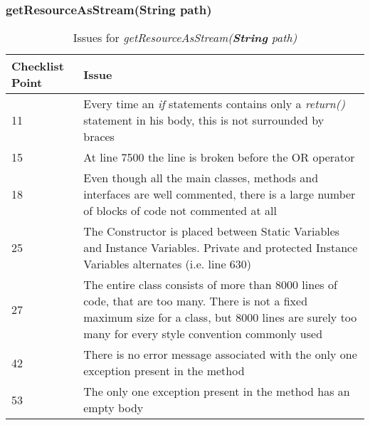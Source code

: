 \subsubsection{getResourceAsStream(String path)}
\begin{table}[htbp]
\begin{center}
\begin{tabular}[t]{p{}p{}}

\hline
\textbf{Checklist Point} & \textbf{Issue} \\
\hline
11 & Every time an \textit{if} statements contains only a \textit{return()} statement in his body, this is not surrounded by braces \\
\hline
15 & At line 7500 the line is broken before the OR operator \\
\hline
18 & Even though all the main classes, methods and interfaces are well commented, there is a large number of blocks of code not commented at all  \\
\hline
25 & The Constructor is placed between Static Variables and  Instance Variables. Private and protected Instance Variables alternates (i.e. line 630) \\
\hline
27 & The entire class consists of more than 8000 lines of code, that are too many. There is not a fixed maximum size for a class, but 8000 lines are surely too many for every style convention commonly used \\
\hline
42 & There is no error message associated with the only one exception present in the method \\
\hline
53 & The only one exception present in the method has an empty body \\
\hline

\end{tabular}
\end{center}
\caption{Issues for \textit{getResourceAsStream(\textbf{String} path)}}
\end{table}
\clearpage

